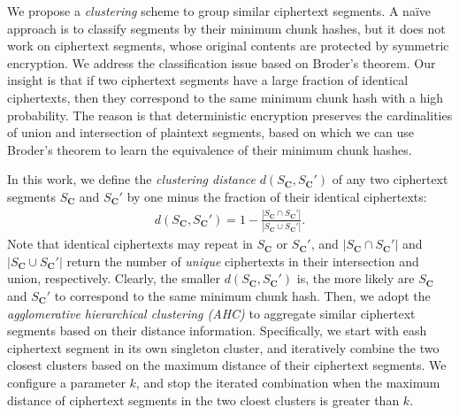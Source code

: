We propose a {\em clustering} scheme to group similar ciphertext segments. A na\"{i}ve approach is to classify segments by their minimum chunk hashes, but it does not work on ciphertext segments, whose original contents are protected by symmetric encryption. We address the classification issue based on Broder's theorem.   
Our insight is that if two ciphertext segments have a large fraction of identical ciphertexts, then  they correspond to the same minimum chunk hash with a high probability. The reason is that deterministic encryption preserves the cardinalities of union and intersection of plaintext segments, based on which we can use Broder's theorem to learn the equivalence of their minimum chunk hashes.    

In this work, we define the {\em clustering distance} $d(S_\mathbf{C}, S_\mathbf{C}')$ of any two ciphertext segments $S_\mathbf{C}$ and $S_\mathbf{C}'$ by one minus the fraction of their identical ciphertexts:
\begin{eqnarray}
d(S_\mathbf{C}, S_\mathbf{C}') = 1 - \frac{|S_\mathbf{C} \cap S_\mathbf{C}'|}{|S_\mathbf{C} \cup S_\mathbf{C}'|}. \nonumber
\end{eqnarray}
Note that identical ciphertexts may repeat in $S_\mathbf{C}$ or $S_\mathbf{C}'$, and $|S_\mathbf{C} \cap S_\mathbf{C}'|$ and $|S_\mathbf{C} \cup S_\mathbf{C}'|$ return the number of {\em unique} ciphertexts in their  intersection and union, respectively. Clearly,  the smaller $d(S_\mathbf{C}, S_\mathbf{C}')$ is, the more likely are $S_\mathbf{C}$ and $S_\mathbf{C}'$ to correspond to the same minimum chunk hash. Then, we adopt the {\em agglomerative hierarchical clustering (AHC)} \cite{johnson67} to aggregate similar ciphertext segments based on their distance information.  
Specifically, we start with eash ciphertext segment in its own singleton cluster, and iteratively combine the two closest clusters based on the maximum distance of their ciphertext segments. We configure a parameter $k$, 
and stop the iterated combination when the maximum distance of ciphertext segments in the two cloest
clusters is greater than $k$.


